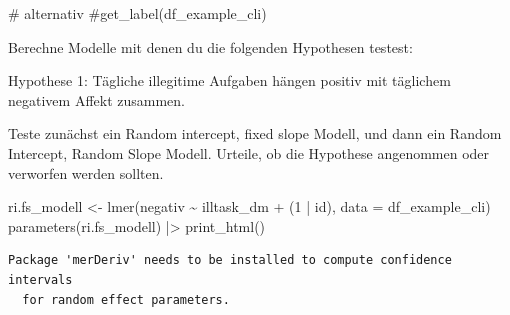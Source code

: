 \documentclass[
  letterpaper,
  DIV=11,
  numbers=noendperiod]{scrreprt}
\newenvironment{Shaded}{\begin{snugshade}}{\end{snugshade}}
\newcommand{\AttributeTok}[1]{\textcolor[rgb]{0.40,0.45,0.13}{#1}}
\newcommand{\CommentTok}[1]{\textcolor[rgb]{0.37,0.37,0.37}{#1}}
\newcommand{\DecValTok}[1]{\textcolor[rgb]{0.68,0.00,0.00}{#1}}
\newcommand{\FunctionTok}[1]{\textcolor[rgb]{0.28,0.35,0.67}{#1}}
\newcommand{\NormalTok}[1]{\textcolor[rgb]{0.00,0.23,0.31}{#1}}
\newcommand{\OtherTok}[1]{\textcolor[rgb]{0.00,0.23,0.31}{#1}}
\newcommand{\SpecialCharTok}[1]{\textcolor[rgb]{0.37,0.37,0.37}{#1}}
\begin{document}
\begin{Shaded}
\begin{Highlighting}[]
\CommentTok{\# alternativ}
\CommentTok{\#get\_label(df\_example\_cli)}
\end{Highlighting}
\end{Shaded}

Berechne Modelle mit denen du die folgenden Hypothesen testest:

Hypothese 1: Tägliche illegitime Aufgaben hängen positiv mit täglichem
negativem Affekt zusammen.

Teste zunächst ein Random intercept, fixed slope Modell, und dann ein
Random Intercept, Random Slope Modell. Urteile, ob die Hypothese
angenommen oder verworfen werden sollten.

\begin{tcolorbox}[enhanced jigsaw, opacitybacktitle=0.6, left=2mm, colback=white, rightrule=.15mm, title=\textcolor{quarto-callout-tip-color}{\faLightbulb}\hspace{0.5em}{Lösung}, breakable, leftrule=.75mm, colframe=quarto-callout-tip-color-frame, toptitle=1mm, toprule=.15mm, titlerule=0mm, arc=.35mm, bottomtitle=1mm, colbacktitle=quarto-callout-tip-color!10!white, coltitle=black, bottomrule=.15mm, opacityback=0]

\begin{Shaded}
\begin{Highlighting}[]
\NormalTok{ri.fs\_modell }\OtherTok{\textless{}{-}} \FunctionTok{lmer}\NormalTok{(negativ }\SpecialCharTok{\textasciitilde{}}\NormalTok{ illtask\_dm }\SpecialCharTok{+}\NormalTok{ (}\DecValTok{1} \SpecialCharTok{|}\NormalTok{ id), }\AttributeTok{data =}\NormalTok{ df\_example\_cli)}
\FunctionTok{parameters}\NormalTok{(ri.fs\_modell) }\SpecialCharTok{|\textgreater{}} \FunctionTok{print\_html}\NormalTok{()}
\end{Highlighting}
\end{Shaded}

\begin{verbatim}
Package 'merDeriv' needs to be installed to compute confidence intervals
  for random effect parameters.
\end{verbatim}


\end{tcolorbox}
\end{document}
